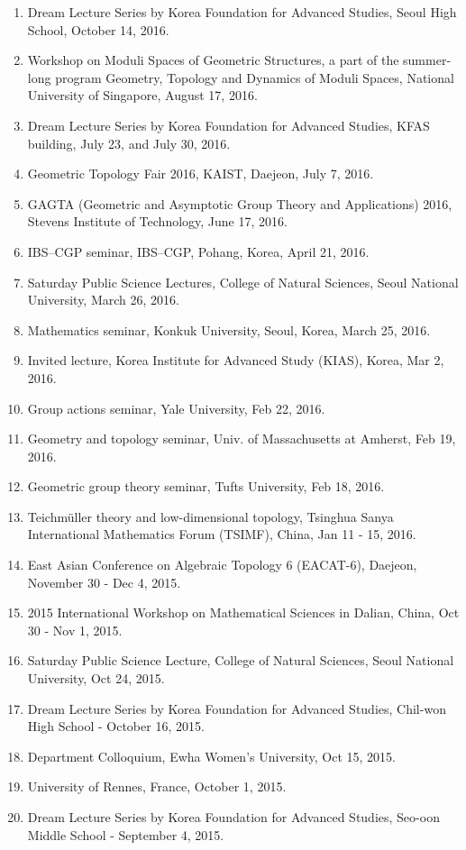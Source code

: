 \documentclass[11pt,a4paper]{article}
\begin{document}
\begin{enumerate}[leftmargin=1.5em, label=\arabic*.]
\item Dream Lecture Series by Korea Foundation for Advanced Studies, Seoul High School, October 14, 2016.
\item Workshop on Moduli Spaces of Geometric Structures, a part of the summer-long program Geometry, Topology and Dynamics of Moduli Spaces, National University of Singapore, August 17, 2016.
\item Dream Lecture Series by Korea Foundation for Advanced Studies, KFAS building, July 23, and July 30, 2016.
\item Geometric Topology Fair 2016, KAIST, Daejeon, July 7, 2016.
\item GAGTA (Geometric and Asymptotic Group Theory and Applications) 2016, Stevens Institute of Technology, June 17, 2016.
\item IBS--CGP seminar, IBS--CGP, Pohang, Korea, April 21, 2016.
\item Saturday Public Science Lectures, College of Natural Sciences, Seoul National University, March 26, 2016.
\item Mathematics seminar, Konkuk University, Seoul, Korea, March 25, 2016.
\item Invited lecture, Korea Institute for Advanced Study (KIAS), Korea, Mar 2, 2016.
\item Group actions seminar, Yale University, Feb 22, 2016.
\item Geometry and topology seminar, Univ. of Massachusetts at Amherst, Feb 19, 2016.
\item Geometric group theory seminar, Tufts University, Feb 18, 2016.
\item Teichmüller theory and low-dimensional topology, Tsinghua Sanya International Mathematics Forum (TSIMF), China, Jan 11 - 15, 2016.
\item East Asian Conference on Algebraic Topology 6 (EACAT-6), Daejeon, November 30 - Dec 4, 2015.
\item 2015 International Workshop on Mathematical Sciences in Dalian, China, Oct 30 - Nov 1, 2015.
\item Saturday Public Science Lecture, College of Natural Sciences, Seoul National University, Oct 24, 2015.
\item Dream Lecture Series by Korea Foundation for Advanced Studies, Chil-won High School - October 16, 2015.
\item Department Colloquium, Ewha Women's University, Oct 15, 2015.
\item University of Rennes, France, October 1, 2015.
\item Dream Lecture Series by Korea Foundation for Advanced Studies, Seo-oon Middle School - September 4, 2015.

\end{enumerate}
\end{document}
